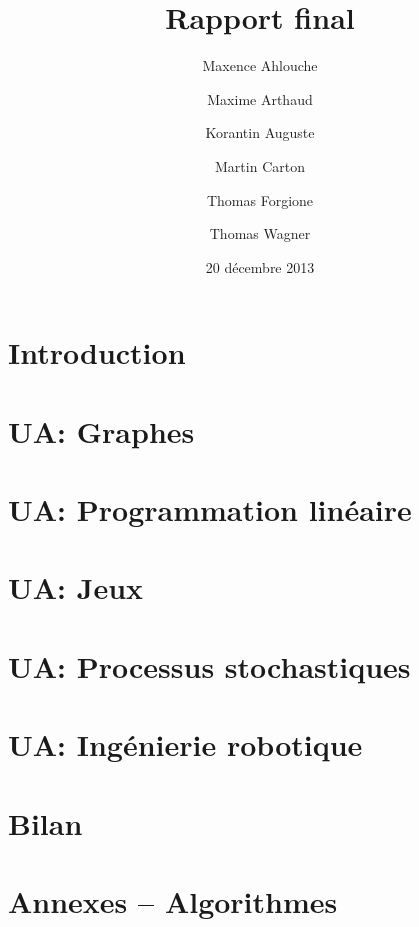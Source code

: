 \documentclass{scrartcl}
\title{Rapport final}
\author{Maxence Ahlouche \and Maxime Arthaud \and Korantin Auguste
  \and Martin Carton \and Thomas Forgione \and Thomas Wagner}
\date{20 décembre 2013}
\begin{document}
  
  \newpage
  \tableofcontents

  \newpage
  \section{Introduction}
    

  \newpage
  \section{UA: Graphes}
    

  \newpage
  \section{UA: Programmation linéaire}
    

  \newpage
  \section{UA: Jeux}
    

  \newpage
  \section{UA: Processus stochastiques}
    

  \newpage
  \section{UA: Ingénierie robotique}
    

  \newpage
  \section{Bilan}
    

  \newpage
  \begin{thebibliography}{99}
    
  \end{thebibliography}

  \newpage
  \section*{Annexes -- Algorithmes}
    
\end{document}
